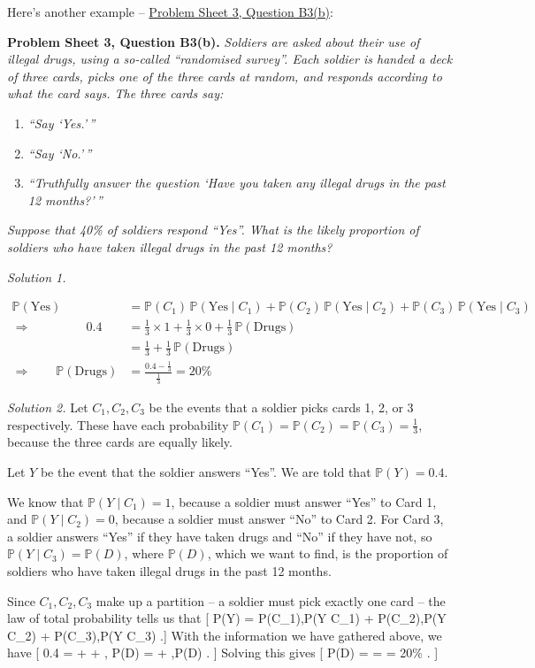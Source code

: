 \documentclass[
  letterpaper,
]{report}
\providecommand{\tightlist}{%
  \setlength{\itemsep}{0pt}\setlength{\parskip}{0pt}}\usepackage{longtable,booktabs,array}
\theoremstyle{definition}
\theoremstyle{definition}
\theoremstyle{remark}
\begin{document}
Here's another example -- \protect\hyperlink{P3-long}{Problem Sheet 3,
Question B3(b)}:

\textbf{Problem Sheet 3, Question B3(b).} \emph{Soldiers are asked about
their use of illegal drugs, using a so-called ``randomised survey''.
Each soldier is handed a deck of three cards, picks one of the three
cards at random, and responds according to what the card says. The three
cards say:}

\begin{enumerate}
\def\labelenumi{\arabic{enumi}.}
\tightlist
\item
  \emph{``Say `Yes.'\,''}
\item
  \emph{``Say `No.'\,''}
\item
  \emph{``Truthfully answer the question `Have you taken any illegal
  drugs in the past 12 months?'\,''}
\end{enumerate}

\emph{Suppose that 40\% of soldiers respond ``Yes''. What is the likely
proportion of soldiers who have taken illegal drugs in the past 12
months?}

\emph{Solution 1.}

\begin{align*} \mathbb P(\text{Yes}) &= \mathbb P(C_1)\,\mathbb P(\text{Yes} \mid C_1) + \mathbb P(C_2)\,\mathbb P(\text{Yes} \mid C_2) + 
\mathbb P(C_3)\,\mathbb P(\text{Yes} \mid C_3) \\
\Rightarrow \qquad\qquad\  \  0.4 &= \tfrac13 \times 1 + \tfrac13 \times 0 + \tfrac13 \, \mathbb P(\text{Drugs}) \\
&=\tfrac13 + \tfrac13 \,\mathbb P(\text{Drugs})  \\
\Rightarrow \qquad \mathbb P(\text{Drugs}) &= \frac{0.4 - \frac13}{\frac13} = 20\%
\end{align*}

\emph{Solution 2.} Let \(C_1, C_2, C_3\) be the events that a soldier
picks cards 1, 2, or 3 respectively. These have each probability
\(\mathbb P(C_1) = \mathbb P(C_2) = \mathbb P(C_3) = \frac13\), because
the three cards are equally likely.

Let \(Y\) be the event that the soldier answers ``Yes''. We are told
that \(\mathbb P(Y) = 0.4\).

We know that \(\mathbb P(Y \mid C_1) = 1\), because a soldier must
answer ``Yes'' to Card 1, and \(\mathbb P(Y \mid C_2) = 0\), because a
soldier must answer ``No'' to Card 2. For Card 3, a soldier answers
``Yes'' if they have taken drugs and ``No'' if they have not, so
\(\mathbb P(Y \mid C_3) = \mathbb P(D)\), where \(\mathbb P(D)\), which
we want to find, is the proportion of soldiers who have taken illegal
drugs in the past 12 months.

Since \(C_1, C_2, C_3\) make up a partition -- a soldier must pick
exactly one card -- the law of total probability tells us that {[}
\mathbb P(Y) = \mathbb P(C\_1),\mathbb P(Y \mid C\_1) +
\mathbb P(C\_2),\mathbb P(Y \mid C\_2) + \mathbb P(C\_3),\mathbb P(Y
\mid C\_3) .{]} With the information we have gathered above, we have {[}
0.4 =   +   +  , \mathbb P(D) =
 +  ,\mathbb P(D) . {]} Solving this gives {[}
\mathbb P(D) =  =  = 20\% . {]}
\end{document}

